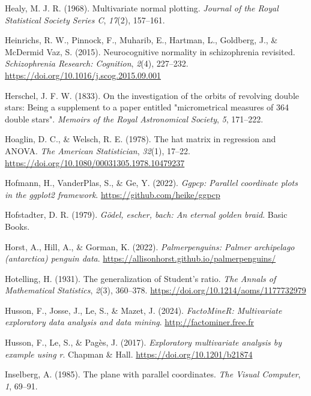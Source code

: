 \documentclass[
  letterpaper,
  10pt,
  krantz2]{krantz}
\newlength{\cslhangindent}
\newenvironment{CSLReferences}[2] %
 {\begin{list}{}{%
  \setlength{\itemindent}{0pt}
  \setlength{\leftmargin}{0pt}
  \setlength{\parsep}{0pt}
  \ifodd #1
   \setlength{\leftmargin}{\cslhangindent}
   \setlength{\itemindent}{-1\cslhangindent}
  \fi
  \setlength{\itemsep}{#2\baselineskip}}}
 {\end{list}}
\begin{document}
{\begin{CSLReferences}{1}{0}
Healy, M. J. R. (1968). Multivariate normal plotting. \emph{Journal of
the Royal Statistical Society Series C}, \emph{17}(2), 157--161.

Heinrichs, R. W., Pinnock, F., Muharib, E., Hartman, L., Goldberg, J.,
\& McDermid Vaz, S. (2015). Neurocognitive normality in schizophrenia
revisited. \emph{Schizophrenia Research: Cognition}, \emph{2}(4),
227--232. \url{https://doi.org/10.1016/j.scog.2015.09.001}

Herschel, J. F. W. (1833). On the investigation of the orbits of
revolving double stars: Being a supplement to a paper entitled
"micrometrical measures of 364 double stars". \emph{Memoirs of the Royal
Astronomical Society}, \emph{5}, 171--222.

Hoaglin, D. C., \& Welsch, R. E. (1978). The hat matrix in regression
and {ANOVA}. \emph{The American Statistician}, \emph{32}(1), 17--22.
\url{https://doi.org/10.1080/00031305.1978.10479237}

Hofmann, H., VanderPlas, S., \& Ge, Y. (2022). \emph{Ggpcp: Parallel
coordinate plots in the ggplot2 framework}.
\url{https://github.com/heike/ggpcp}

Hofstadter, D. R. (1979). \emph{Gödel, escher, bach: An eternal golden
braid}. Basic Books.

Horst, A., Hill, A., \& Gorman, K. (2022). \emph{Palmerpenguins: Palmer
archipelago (antarctica) penguin data}.
\url{https://allisonhorst.github.io/palmerpenguins/}

Hotelling, H. (1931). The generalization of {Student's} ratio. \emph{The
Annals of Mathematical Statistics}, \emph{2}(3), 360--378.
\url{https://doi.org/10.1214/aoms/1177732979}

Husson, F., Josse, J., Le, S., \& Mazet, J. (2024). \emph{FactoMineR:
Multivariate exploratory data analysis and data mining}.
\url{http://factominer.free.fr}

Husson, F., Le, S., \& Pagès, J. (2017). \emph{Exploratory multivariate
analysis by example using r}. Chapman \& Hall.
\url{https://doi.org/10.1201/b21874}

Inselberg, A. (1985). The plane with parallel coordinates. \emph{The
Visual Computer}, \emph{1}, 69--91.


\end{CSLReferences}}
\end{document}

